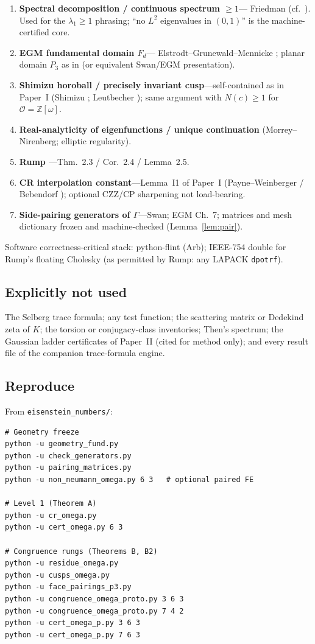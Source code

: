\documentclass[11pt]{amsart}
\newcommand{\ZZ}{\mathbb{Z}}
\begin{document}
\begin{enumerate}
\item \textbf{Spectral decomposition / continuous spectrum $\ge 1$}---
  Friedman \cite[Thm.~3.8.1]{Friedman} (cf.\ \cite[§6.2]{EGM98}).  Used
  for the $\lambda_1\ge 1$ phrasing; ``no $L^2$ eigenvalues in $(0,1)$''
  is the machine-certified core.
\item \textbf{EGM fundamental domain $F_d$}---
  Elstrodt--Grunewald--Mennicke \cite[§7.2--7.3]{EGM98}; planar domain
  $P_3$ as in \cite[§2.3]{DP20} (or equivalent Swan/EGM presentation).
\item \textbf{Shimizu horoball / precisely invariant cusp}---self-contained
  as in Paper~I (Shimizu \cite{Shimizu63}; Leutbecher \cite{Leutbecher67});
  same argument with $N(c)\ge 1$ for $\mathcal{O}=\ZZ[\omega]$.
\item \textbf{Real-analyticity of eigenfunctions / unique continuation}
  (Morrey--Nirenberg; elliptic regularity).
\item \textbf{Rump \cite{Rump06}}---Thm.~2.3 / Cor.~2.4 / Lemma~2.5.
\item \textbf{CR interpolation constant}---Lemma~I1 of Paper~I
  (Payne--Weinberger \cite{PW60} / Bebendorf \cite{Bebendorf03}); optional
  CZZ/CP sharpening not load-bearing.
\item \textbf{Side-pairing generators of $\Gamma$}---Swan; EGM Ch.~7;
  matrices and mesh dictionary frozen and machine-checked
  (Lemma~\ref{lem:pair}).
\end{enumerate}

Software correctness-critical stack: python-flint (Arb); IEEE-754 double
for Rump's floating Cholesky (as permitted by Rump: any LAPACK
\texttt{dpotrf}).

\subsection{Explicitly not used}

The Selberg trace formula; any test function; the scattering matrix or
Dedekind zeta of $K$; the torsion or conjugacy-class inventories; Then's
spectrum; the Gaussian ladder certificates of Paper~II (cited for method
only); and every result file of the companion trace-formula engine.

\subsection{Reproduce}

From \texttt{eisenstein\_numbers/}:
\begin{verbatim}
# Geometry freeze
python -u geometry_fund.py
python -u check_generators.py
python -u pairing_matrices.py
python -u non_neumann_omega.py 6 3   # optional paired FE

# Level 1 (Theorem A)
python -u cr_omega.py
python -u cert_omega.py 6 3

# Congruence rungs (Theorems B, B2)
python -u residue_omega.py
python -u cusps_omega.py
python -u face_pairings_p3.py
python -u congruence_omega_proto.py 3 6 3
python -u congruence_omega_proto.py 7 4 2
python -u cert_omega_p.py 3 6 3
python -u cert_omega_p.py 7 6 3
\end{verbatim}
\end{document}
